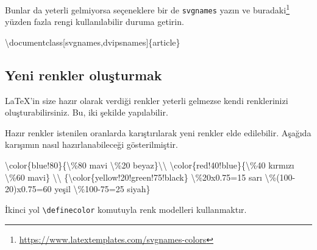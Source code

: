 \documentclass[
  10pt,
]{scrbook}
\newenvironment{Shaded}{}{}
\newcommand{\BuiltInTok}[1]{#1}
\newcommand{\ExtensionTok}[1]{#1}
\newcommand{\FunctionTok}[1]{\textcolor[rgb]{0.02,0.16,0.49}{#1}}
\newcommand{\NormalTok}[1]{#1}
\renewcommand{\href}[2]{#2\footnote{\url{#1}}}
\theoremstyle{definition}
\theoremstyle{definition}
\theoremstyle{definition}
\theoremstyle{definition}
\theoremstyle{remark}
\begin{document}
Bunlar da yeterli gelmiyorsa seçeneklere bir de \texttt{svgnames} yazın ve \href{https://www.latextemplates.com/svgnames-colors}{buradaki} yüzden fazla rengi kullanılabilir duruma getirin.

\begin{Shaded}
\begin{Highlighting}[]
\BuiltInTok{\textbackslash{}documentclass}\NormalTok{[svgnames,dvipsnames]\{}\ExtensionTok{article}\NormalTok{\}}
\end{Highlighting}
\end{Shaded}

\hypertarget{yeni-renkler-oluux15fturmak}{%
\subsection{Yeni renkler oluşturmak}\label{yeni-renkler-oluux15fturmak}}

LaTeX'in size hazır olarak verdiği renkler yeterli gelmezse kendi renklerinizi oluşturabilirsiniz. Bu, iki şekilde yapılabilir.

Hazır renkler istenilen oranlarda karıştırılarak yeni renkler elde edilebilir. Aşağıda karışımın nasıl hazırlanabileceği gösterilmiştir.

\begin{Shaded}
\begin{Highlighting}[]
\FunctionTok{\textbackslash{}color}\NormalTok{\{blue!80\}\{}\FunctionTok{\textbackslash{}\%}\NormalTok{80 mavi }\FunctionTok{\textbackslash{}\%}\NormalTok{20 beyaz\}}\FunctionTok{\textbackslash{}\textbackslash{}}
\FunctionTok{\textbackslash{}color}\NormalTok{\{red!40!blue\}\{}\FunctionTok{\textbackslash{}\%}\NormalTok{40 kırmızı }\FunctionTok{\textbackslash{}\%}\NormalTok{60 mavi\} }\FunctionTok{\textbackslash{}\textbackslash{}}
\NormalTok{\{}\FunctionTok{\textbackslash{}color}\NormalTok{\{yellow!20!green!75!black\} }\FunctionTok{\textbackslash{}\%}\NormalTok{20x0.75=15 sarı}
\FunctionTok{\textbackslash{}\%}\NormalTok{(100{-}20)x0.75=60 yeşil }\FunctionTok{\textbackslash{}\%}\NormalTok{100{-}75=25 siyah\}}
\end{Highlighting}
\end{Shaded}

İkinci yol \texttt{\textbackslash{}definecolor} komutuyla renk modelleri kullanmaktır.
\end{document}

